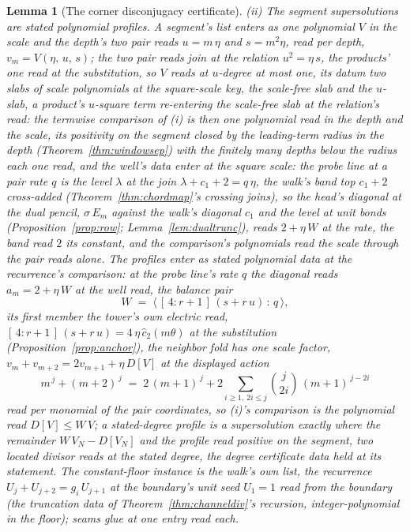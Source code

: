 \documentclass[11pt]{article}
\newtheorem{lemma}{Lemma}
\theoremstyle{definition}
\begin{document}
\begin{lemma}[The corner disconjugacy certificate]
\emph{(ii) The segment supersolutions are stated polynomial
profiles.} A segment's list enters as one polynomial $V$ in the
scale and the depth's two pair reads $u=m\,\eta$ and
$s=m^{2}\eta$, read per depth, $v_m=V(\eta,\,u,\,s)$; the two
pair reads join at the relation $u^{2}=\eta\,s$, the products'
one read at the substitution, so $V$ reads at $u$-degree at most
one, its datum two slabs of scale polynomials at the square-scale
key, the scale-free slab and the $u$-slab, a product's $u$-square
term re-entering the scale-free slab at the relation's read: the
termwise
comparison of (i) is then one polynomial read in the depth and the
scale, its positivity on the segment closed by the leading-term
radius in the depth (Theorem~\ref{thm:windowsep}) with the
finitely many depths below the radius each one read, and the
well's data enter at the square scale: the probe line at a pair
rate $q$ is the level $\lambda$ at the join $\lambda+c_1+2=q\,\eta$,
the walk's band top $c_1+2$ cross-added
(Theorem~\ref{thm:chordmap}'s crossing joins), so the head's
diagonal at the dual pencil, $\sigma\,E_m$ against the walk's
diagonal $c_1$ and the level at unit bonds
(Proposition~\ref{prop:row}; Lemma~\ref{lem:dualtrunc}), reads
$2+\eta\,W$ at the rate, the band read $2$ its constant, and the
comparison's polynomials read the scale through the pair reads
alone. The profiles enter as stated polynomial data at the
recurrence's comparison: at the probe
line's rate $q$ the diagonal reads $a_m=2+\eta\,W$ at the
\emph{well read}, the balance pair
\[
W\;=\;\big\langle\,[\,4:r+1\,]\,(s+r\,u)\,:\,q\,\big\rangle ,
\]
its first member the tower's own electric read,
$[\,4:r+1\,]\,(s+r\,u)=4\,\eta\,\hat c_2(m\theta)$ at the
substitution (Proposition~\ref{prop:anchor}),
the neighbor fold has one scale factor,
$v_{m}+v_{m+2}=2v_{m+1}+\eta\,D[V]$ at the
displayed action
\[
m^{\,j}+(m{+}2)^{\,j}
\;=\;2\,(m{+}1)^{\,j}+2\sum_{i\ge1,\ 2i\le j}\binom{j}{2i}\,(m{+}1)^{\,j-2i}
\]
read per monomial of the pair coordinates, so (i)'s comparison is
the polynomial read $D[V]\le W\,V$; a stated-degree profile is a
supersolution exactly where the remainder $W\,V_N-D[V_N]$ and the
profile read positive on the segment, two located divisor reads at
the stated degree, the degree certificate data held at its
statement.
The constant-floor instance is the walk's own list, the
recurrence $U_{j}+U_{j+2}=g_i\,U_{j+1}$ at the boundary's unit seed
$U_1=1$ read from the
boundary (the truncation data of Theorem~\ref{thm:channeldiv}'s
recursion, integer-polynomial in the floor); seams glue at one
entry read each.


\end{lemma}
\end{document}
